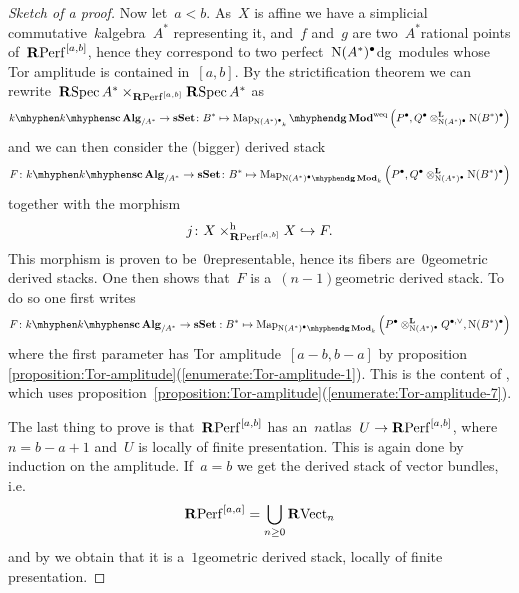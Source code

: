 \begin{refsection}
\begin{theorem}
\begin{proof}[Sketch of a proof]
    Now let~$a<b$. As~$X$ is affine we have a simplicial commutative~$k$\dash algebra~$A^*$ representing it, and~$f$ and~$g$ are two~$A^*$\dash rational points of~$\mathbf{R}\mathrm{Perf}^{[a,b]}$, hence they correspond to two perfect~$\operatorname{N}(A^*)^\bullet$\dash dg~modules whose Tor amplitude is contained in~$[a,b]$. By the strictification theorem \cite[appendix B]{hagII} we can rewrite~$\operatorname{\mathbf{R}Spec} A^*\times_{\mathbf{R}\mathrm{Perf}^{[a,b]}}\operatorname{\mathbf{R}Spec} A^*$ as
    \begin{equation}
      k\mhyphen\scAlg_{/A^*}\to\sSet\colon B^*\mapsto\Map_{{\nerve(A^*)^\bullet}_k}\mhyphen\dgMod^{\mathrm{weq}}\left( P^\bullet,Q^\bullet\otimes_{\nerve(A^*)^\bullet}^{\mathbf{L}}\nerve(B^*)^\bullet \right)
    \end{equation}
    and we can then consider the (bigger) derived stack
    \begin{equation}
      F\colon k\mhyphen\scAlg_{/A^*}\to\sSet\colon B^*\mapsto\Map_{{\nerve(A^*)^\bullet}\mhyphen\dgMod_k}\left( P^\bullet,Q^\bullet\otimes_{\nerve(A^*)^\bullet}^{\mathbf{L}}\nerve(B^*)^\bullet \right)
    \end{equation}
    together with the morphism
    \begin{equation}
      j\colon X\times_{\mathbf{R}\mathrm{Perf}^{[a,b]}}^{\mathrm{h}}X\hookrightarrow F.
    \end{equation}
    This morphism is proven to be~$0$\dash representable, hence its fibers are~$0$\dash geometric derived stacks. One then shows that~$F$ is a~$(n-1)$\dash geometric derived stack. To do so one first writes
    \begin{equation}
      F\colon k\mhyphen\scAlg_{/A^*}\to\sSet:B^*\mapsto\Map_{{\nerve(A^*)^\bullet}\mhyphen\dgMod_k}\left( P^\bullet\otimes_{\nerve(A^*)^\bullet}^{\mathbf{L}}Q^{\bullet,\vee},\nerve(B^*)^\bullet \right)
    \end{equation}
    where the first parameter has Tor amplitude~$[a-b,b-a]$ by proposition \ref{proposition:Tor-amplitude}(\ref{enumerate:Tor-amplitude-1}). This is the content of \cite[sublemma 3.9]{toen-vaquie}, which uses proposition~\ref{proposition:Tor-amplitude}(\ref{enumerate:Tor-amplitude-7}).

    The last thing to prove is that~$\mathbf{R}\mathrm{Perf}^{[a,b]}$ has an~$n$\dash atlas~$U\to\mathbf{R}\mathrm{Perf}^{[a,b]}$, where~$n=b-a+1$ and~$U$ is locally of finite presentation. This is again done by induction on the amplitude. If~$a=b$ we get the derived stack of vector bundles, i.e.\
    \begin{equation}
      \mathbf{R}\mathrm{Perf}^{[a,a]}=\bigcup_{n\geq 0}\mathbf{R}\mathrm{Vect}_n
    \end{equation}
    and by \cite[corollary 1.3.7.4]{hagII} we obtain that it is a~$1$\dash geometric derived stack, locally of finite presentation.


\end{proof}
\end{theorem}
\end{refsection}
